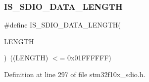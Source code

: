 \subsubsection{\texorpdfstring{I\+S\+\_\+\+S\+D\+I\+O\+\_\+\+D\+A\+T\+A\+\_\+\+L\+E\+N\+G\+TH}{IS\_SDIO\_DATA\_LENGTH}}
{\footnotesize\ttfamily \#define I\+S\+\_\+\+S\+D\+I\+O\+\_\+\+D\+A\+T\+A\+\_\+\+L\+E\+N\+G\+TH(\begin{DoxyParamCaption}\item[{}]{L\+E\+N\+G\+TH }\end{DoxyParamCaption})~((L\+E\+N\+G\+TH) $<$= 0x01\+F\+F\+F\+F\+F\+F)}



Definition at line 297 of file stm32f10x\+\_\+sdio.\+h.

